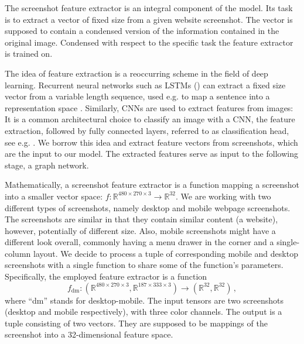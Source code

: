 The screenshot feature extractor is an integral component of the model. Its task is to extract a vector of fixed size from a given website screenshot. The vector is supposed to contain a condensed version of the information contained in the original image. Condensed with respect to the specific task the feature extractor is trained on.

The idea of feature extraction is a reoccurring scheme in the field of deep learning. Recurrent neural networks such as LSTMs (\cite{hochreiter1997lstm}) can extract a fixed size vector from a variable length sequence, used e.g. to map a sentence into a representation space \cite{salesforceabstractivesummarization}. Similarly, CNNs are used to extract features from images: It is a common architectural choice to classify an image with a CNN, the feature extraction, followed by fully connected layers, referred to as classification head, see e.g. \cite{krizhevsky:imagenet,Girshick15:fastrcnn,szegedy2017inception}. We borrow this idea and extract feature vectors from screenshots, which are the input to our model. The extracted features serve as input to the following stage, a graph network.

Mathematically, a screenshot feature extractor is a function mapping a screenshot into a smaller vector space: $f:\mathbb{R}^{480\times270\times3}\rightarrow\mathbb{R}^{32}$. We are working with two different types of screenshots, namely desktop and mobile webpage screenshots. The screenshots are similar in that they contain similar content (a website), however, potentially of different size. Also, mobile screenshots might have a different look overall, commonly having a menu drawer in the corner and a single-column layout. We decide to process a tuple of corresponding mobile and desktop screenshots with a single function to share some of the function's parameters. Specifically, the employed feature extractor is a function \begin{equation}
f_\text{dm}:\left(\mathbb{R}^{480\times270\times3},\mathbb{R}^{187\times333\times3}\right)\rightarrow\left(\mathbb{R}^{32},\mathbb{R}^{32}\right)\,,
\end{equation} where \enquote{dm} stands for desktop-mobile. The input tensors are two screenshots (desktop and mobile respectively), with three color channels. The output is a tuple consisting of two vectors. They are supposed to be mappings of the screenshot into a 32-dimensional feature space.

